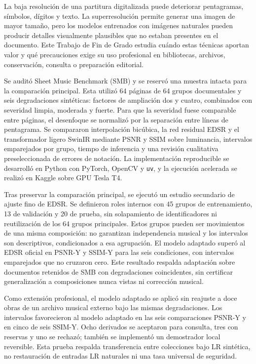 La baja resolución de una partitura digitalizada puede deteriorar pentagramas, símbolos, dígitos y
texto. La superresolución permite generar una imagen de mayor tamaño, pero los modelos entrenados
con imágenes naturales pueden producir detalles visualmente plausibles que no estaban presentes en
el documento. Este Trabajo de Fin de Grado estudia cuándo estas técnicas aportan valor y qué
precauciones exige su uso profesional en bibliotecas, archivos, conservación, consulta o
preparación editorial.

Se auditó Sheet Music Benchmark (SMB) y se reservó una muestra intacta para la comparación
principal. Esta utilizó 64 páginas de 64 grupos documentales y seis degradaciones sintéticas:
factores de ampliación dos y cuatro, combinados con severidad limpia, moderada y fuerte. Para que la
severidad fuese comparable entre páginas, el desenfoque se normalizó por la separación entre líneas
de pentagrama. Se compararon interpolación bicúbica, la red residual EDSR y el transformador ligero
SwinIR mediante PSNR y SSIM sobre luminancia, intervalos emparejados por grupo, tiempo de inferencia
y una revisión cualitativa preseleccionada de errores de notación. La implementación reproducible
se desarrolló en Python con PyTorch, OpenCV y \texttt{uv}, y la ejecución acelerada se realizó en
Kaggle sobre GPU Tesla T4.

Tras preservar la comparación principal, se ejecutó un estudio secundario de ajuste fino de EDSR.
Se definieron roles internos con 45 grupos de entrenamiento, 13 de validación y 20 de
prueba, sin solapamiento de identificadores ni reutilización de los 64 grupos principales.
Estos grupos pueden ser movimientos de una misma composición: no garantizan independencia
musical y los intervalos son descriptivos, condicionados a esa agrupación. El modelo adaptado superó al
EDSR oficial en PSNR-Y y SSIM-Y para las seis condiciones, con intervalos emparejados que no
cruzaron cero. Este resultado respalda adaptación sobre documentos retenidos de SMB con degradaciones
coincidentes, sin certificar generalización a composiciones nunca vistas ni corrección musical.

Como extensión profesional, el modelo adaptado se aplicó sin reajuste a doce obras de un archivo
musical externo bajo las mismas degradaciones. Los intervalos favorecieron al modelo adaptado en
las seis comparaciones PSNR-Y y en cinco de seis SSIM-Y. Ocho derivados se aceptaron para consulta,
tres con reservas y uno se rechazó; también se implementó un demostrador local reversible. Esta
prueba respalda transferencia entre colecciones bajo LR sintética, no restauración de entradas LR
naturales ni una tasa universal de seguridad.

